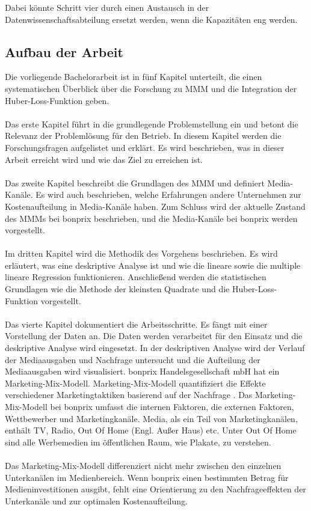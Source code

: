 Dabei könnte Schritt vier durch einen Austausch in der Datenwissenschaftsabteilung ersetzt werden, wenn die Kapazitäten eng werden.   
\subsection{Aufbau der Arbeit}
Die vorliegende Bachelorarbeit ist in fünf Kapitel unterteilt, die einen systematischen Überblick über die Forschung zu \ac{MMM} und die Integration der Huber-Loss-Funktion geben.\\\\
Das erste Kapitel  führt in die grundlegende Problemstellung ein und betont die Relevanz der Problemlösung für den Betrieb. In diesem Kapitel werden die Forschungsfragen aufgelistet und erklärt. Es wird beschrieben, was in dieser Arbeit erreicht wird und wie das Ziel zu erreichen ist. \\\\
Das zweite Kapitel  beschreibt die Grundlagen des \ac{MMM} und definiert Media-Kanäle. Es wird auch beschrieben, welche Erfahrungen andere Unternehmen zur Kostenaufteilung in Media-Kanäle haben. Zum Schluss wird der aktuelle Zustand des \ac{MMM}s bei bonprix beschrieben, und die Media-Kanäle bei bonprix werden vorgestellt. \\\\ 
Im dritten Kapitel  wird die Methodik des Vorgehens beschrieben. Es wird erläutert, was eine deskriptive Analyse ist und wie die lineare sowie die multiple lineare Regression funktionieren. Anschließend werden die statistischen Grundlagen wie die Methode der kleinsten Quadrate und die Huber-Loss-Funktion vorgestellt.\\\\
Das vierte Kapitel  dokumentiert die Arbeitsschritte. Es fängt mit einer Vorstellung der Daten an. Die Daten werden verarbeitet für den Einsatz und die deskriptive Analyse wird eingesetzt. In der deskriptiven Analyse wird der Verlauf der Mediaausgaben und Nachfrage untersucht und die Aufteilung der Mediaausgaben wird visualisiert.  
\iffalse
bonprix Handelsgesellschaft mbH hat ein Marketing-Mix-Modell. Marketing-Mix-Modell quantifiziert die Effekte verschiedener Marketingtaktiken basierend auf der Nachfrage \cite{MMMdef}. Das Marketing-Mix-Modell bei bonprix umfasst die internen Faktoren, die externen Faktoren, Wettbewerber und Marketingkanäle. Media, als ein Teil von Marketingkanälen, enthält TV, Radio, Out Of Home (Engl. Außer Haus) etc. Unter Out Of Home sind alle Werbemedien im öffentlichen Raum, wie Plakate, zu verstehen. \\\\
Das Marketing-Mix-Modell differenziert nicht mehr zwischen den einzelnen Unterkanälen im Medienbereich. Wenn bonprix einen bestimmten Betrag für Medieninvestitionen ausgibt, fehlt eine Orientierung zu den Nachfrageeffekten der Unterkanäle und zur optimalen Kostenaufteilung.

